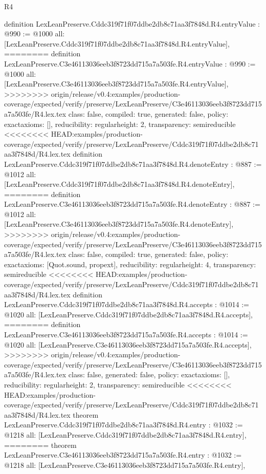 \begin{lexlean}{R4}
\begin{coremodule}
{{{{{{{{{{{{{{definition LexLeanPreserve.Cddc319f71f07ddbe2db8c71aa3f7848d.R4.entryValue : @990 := @1000 {
  all: [LexLeanPreserve.Cddc319f71f07ddbe2db8c71aa3f7848d.R4.entryValue],
========
definition LexLeanPreserve.C3e46113036eeb3f8723dd715a7a503fe.R4.entryValue : @990 := @1000 {
  all: [LexLeanPreserve.C3e46113036eeb3f8723dd715a7a503fe.R4.entryValue],
>>>>>>>> origin/release/v0.4:examples/production-coverage/expected/verify/preserve/LexLeanPreserve/C3e46113036eeb3f8723dd715a7a503fe/R4.lex.tex
  class: false,
  compiled: true,
  generated: false,
  policy: exact{axioms: []},
  reducibility: regular{height: 2},
  transparency: semireducible
}
<<<<<<<< HEAD:examples/production-coverage/expected/verify/preserve/LexLeanPreserve/Cddc319f71f07ddbe2db8c71aa3f7848d/R4.lex.tex
definition LexLeanPreserve.Cddc319f71f07ddbe2db8c71aa3f7848d.R4.denoteEntry : @887 := @1012 {
  all: [LexLeanPreserve.Cddc319f71f07ddbe2db8c71aa3f7848d.R4.denoteEntry],
========
definition LexLeanPreserve.C3e46113036eeb3f8723dd715a7a503fe.R4.denoteEntry : @887 := @1012 {
  all: [LexLeanPreserve.C3e46113036eeb3f8723dd715a7a503fe.R4.denoteEntry],
>>>>>>>> origin/release/v0.4:examples/production-coverage/expected/verify/preserve/LexLeanPreserve/C3e46113036eeb3f8723dd715a7a503fe/R4.lex.tex
  class: false,
  compiled: true,
  generated: false,
  policy: exact{axioms: [Quot.sound, propext]},
  reducibility: regular{height: 4},
  transparency: semireducible
}
<<<<<<<< HEAD:examples/production-coverage/expected/verify/preserve/LexLeanPreserve/Cddc319f71f07ddbe2db8c71aa3f7848d/R4.lex.tex
definition LexLeanPreserve.Cddc319f71f07ddbe2db8c71aa3f7848d.R4.accepts : @1014 := @1020 {
  all: [LexLeanPreserve.Cddc319f71f07ddbe2db8c71aa3f7848d.R4.accepts],
========
definition LexLeanPreserve.C3e46113036eeb3f8723dd715a7a503fe.R4.accepts : @1014 := @1020 {
  all: [LexLeanPreserve.C3e46113036eeb3f8723dd715a7a503fe.R4.accepts],
>>>>>>>> origin/release/v0.4:examples/production-coverage/expected/verify/preserve/LexLeanPreserve/C3e46113036eeb3f8723dd715a7a503fe/R4.lex.tex
  class: false,
  generated: false,
  policy: exact{axioms: []},
  reducibility: regular{height: 2},
  transparency: semireducible
}
<<<<<<<< HEAD:examples/production-coverage/expected/verify/preserve/LexLeanPreserve/Cddc319f71f07ddbe2db8c71aa3f7848d/R4.lex.tex
theorem LexLeanPreserve.Cddc319f71f07ddbe2db8c71aa3f7848d.R4.entry : @1032 := @1218 {
  all: [LexLeanPreserve.Cddc319f71f07ddbe2db8c71aa3f7848d.R4.entry],
========
theorem LexLeanPreserve.C3e46113036eeb3f8723dd715a7a503fe.R4.entry : @1032 := @1218 {
  all: [LexLeanPreserve.C3e46113036eeb3f8723dd715a7a503fe.R4.entry],
}}}}}}}}}}}}}}}}}}}
\end{coremodule}
\end{lexlean}
